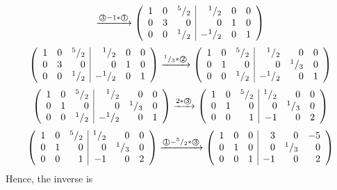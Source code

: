 \documentclass[8pt]{article} %
\begin{document}
\begin{enumerate}[1]
\begin{enumerate}[\bf(a)]
\[\xrightarrow{\text{\textcircled{3}$-1*$\textcircled{1}}}\left(\begin{array}{rrr|rrr}
1&0&{^{5}/_{2}}&{^{1}/_{2}}&0&0\\
0&3&0&0&1&0\\
0&0&{^{1}/_{2}}&-{^{1}/_{2}}&0&1\\
\end{array}\right)
\]\[\left(\begin{array}{rrr|rrr}
1&0&{^{5}/_{2}}&{^{1}/_{2}}&0&0\\
0&3&0&0&1&0\\
0&0&{^{1}/_{2}}&-{^{1}/_{2}}&0&1\\
\end{array}\right)
\xrightarrow{\text{${^{1}/_{3}}*$\textcircled{2}}}\left(\begin{array}{rrr|rrr}
1&0&{^{5}/_{2}}&{^{1}/_{2}}&0&0\\
0&1&0&0&{^{1}/_{3}}&0\\
0&0&{^{1}/_{2}}&-{^{1}/_{2}}&0&1\\
\end{array}\right)
\]\[\left(\begin{array}{rrr|rrr}
1&0&{^{5}/_{2}}&{^{1}/_{2}}&0&0\\
0&1&0&0&{^{1}/_{3}}&0\\
0&0&{^{1}/_{2}}&-{^{1}/_{2}}&0&1\\
\end{array}\right)
\xrightarrow{\text{$2*$\textcircled{3}}}\left(\begin{array}{rrr|rrr}
1&0&{^{5}/_{2}}&{^{1}/_{2}}&0&0\\
0&1&0&0&{^{1}/_{3}}&0\\
0&0&1&-1&0&2\\
\end{array}\right)
\]\[\left(\begin{array}{rrr|rrr}
1&0&{^{5}/_{2}}&{^{1}/_{2}}&0&0\\
0&1&0&0&{^{1}/_{3}}&0\\
0&0&1&-1&0&2\\
\end{array}\right)
\xrightarrow{\text{\textcircled{1}$-{^{5}/_{2}}*$\textcircled{3}}}\left(\begin{array}{rrr|rrr}
1&0&0&3&0&-5\\
0&1&0&0&{^{1}/_{3}}&0\\
0&0&1&-1&0&2\\
\end{array}\right)
\]
Hence, the inverse is

\end{enumerate}
\end{enumerate}
\end{document}
